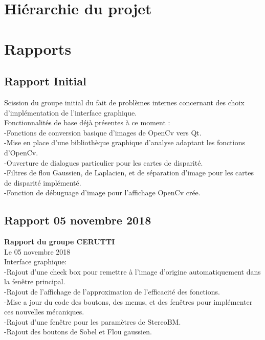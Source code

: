 \documentclass{article}
\begin{document}
\listoffigures

\newpage
\section{Hiérarchie du projet}



\newpage
\section{Rapports}
\subsection{Rapport Initial}
Scission du groupe initial du fait de problèmes internes concernant des choix d'implémentation de l'interface graphique.\\

Fonctionnalités de base déjà présentes à ce moment :\\
	-Fonctions de conversion basique d'images de OpenCv vers Qt.\\
	-Mise en place d'une bibliothèque graphique d'analyse adaptant les fonctions d'OpenCv.\\
	-Ouverture de dialogues particulier pour les cartes de disparité.\\
	-Filtres de flou Gaussien, de Laplacien, et de séparation d'image pour les cartes de disparité implémenté.\\
	-Fonction de débuguage d'image pour l'affichage OpenCv crée.\\


\subsection{Rapport 05 novembre 2018}

\textbf{Rapport du groupe CERUTTI}\\
Le 05 novembre 2018\\

Interface graphique:\\
	-Rajout d'une check box pour remettre à l'image d'origine automatiquement dans la fenêtre principal.\\
	-Rajout de l'affichage de l'approximation de l'efficacité des fonctions.\\
	-Mise a jour du code des boutons, des menus, et des fenêtres pour implémenter ces nouvelles mécaniques.\\
	-Rajout d'une fenêtre pour les paramètres de StereoBM.\\
	-Rajout des boutons de Sobel et Flou gaussien.
\\
	
\end{document}
